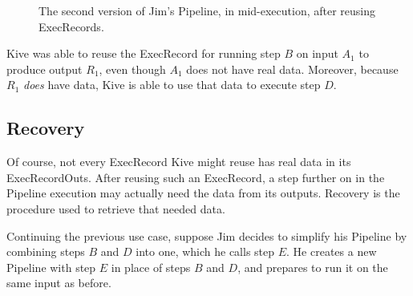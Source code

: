 \documentclass[12pt]{article}
\begin{document}
\begin{figure}[ht]
  \caption{The second version of Jim's Pipeline, in mid-execution, after reusing ExecRecords.}
  \label{fig:newmidexec}
\end{figure}

Kive was able to reuse the ExecRecord for running step $B$ on input $A_1$
to produce output $R_1$, even though $A_1$ does not have real data. Moreover,
because $R_1$ \emph{does} have data, Kive is able to use that data to
execute step $D$.

\subsection*{Recovery}

Of course, not every ExecRecord Kive might reuse has real data in its
ExecRecordOuts. After reusing such an ExecRecord, a step further on in
the Pipeline execution may actually need the data from its outputs. Recovery is
the procedure used to retrieve that needed data.

Continuing the previous use case, suppose Jim decides to simplify his Pipeline
by combining steps $B$ and $D$ into one, which he calls step $E$. He creates a
new Pipeline with step $E$ in place of steps $B$ and $D$, and prepares to run
it on the same input as before.
\end{document}
